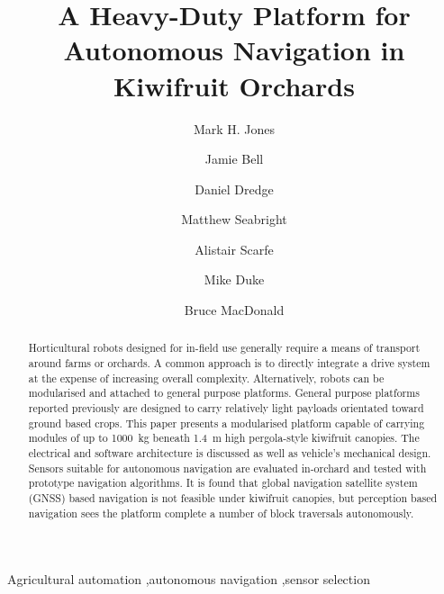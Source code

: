\documentclass[preprint,authoryear,12pt]{elsarticle}
\begin{document}
\begin{frontmatter}

\title{A Heavy-Duty Platform for Autonomous Navigation in Kiwifruit Orchards}

\author[UoW]{Mark H. Jones}

\author[UoA]{Jamie Bell}
\author[UoW]{Daniel Dredge}
\author[UoW]{Matthew Seabright}
\author[RPL]{Alistair Scarfe}
\author[UoW]{Mike Duke}
\author[UoA]{Bruce MacDonald}

\address[UoW]{School of Engineering, University of Waikato, Hamilton, New Zealand}
\address[UoA]{Faculty of Engineering, University of Auckland, Auckland, New Zealand}
\address[RPL]{Robotics Plus Ltd, Newnham Innovation Park, Tauranga, New Zealand}

\begin{abstract}
    Horticultural robots designed for in-field use generally require a means of transport around farms or orchards.
    A common approach is to directly integrate a drive system at the expense of increasing overall complexity.
    Alternatively, robots can be modularised and attached to general purpose platforms.
    General purpose platforms reported previously are designed to carry relatively light payloads orientated toward ground based crops.
    This paper presents a modularised platform capable of carrying modules of up to \SI{1000}{\kilo\gram} beneath \SI{1.4}{\meter} high pergola-style kiwifruit canopies.
    The electrical and software architecture is discussed as well as vehicle's mechanical design.
    Sensors suitable for autonomous navigation are evaluated in-orchard and tested with prototype navigation algorithms.
    It is found that global navigation satellite system (GNSS) based navigation is not feasible under kiwifruit canopies, but perception based navigation sees the platform complete a number of block traversals autonomously.


\end{abstract}

\begin{keyword}
    Agricultural automation \sep autonomous navigation \sep sensor selection
\end{keyword}

\end{frontmatter}

\linenumbers

\begin{table}
  \small
   \begin{framed}
     \printnomenclature
   \end{framed}
\end{table}
\end{document}
